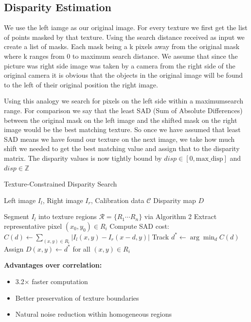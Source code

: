 \documentclass{article}
\begin{document}
\newpage
\subsection{Disparity Estimation}
\vspace{1cm}
We use the left iamge as our original image. For every texture we first get the list of points masked by that texture. Using the search distance received as input
we create a list of masks. Each mask being a k pixels away from the original mask where k ranges from 0 to maximum search distance. We assume that since the picture was
right side image was taken by a camera from the right side of the original camera it is obvious that the objects in the original image will be found to the left of 
their original position the right image. 

Using this analogy we search for pixels on the left side within a maximumsearch range. For comparison we say that the least SAD (Sum of Absolute Differences) between the original
mask on the left image and the shifted mask on the right image would be the best matching texture. So once we have assumed that least SAD means we have found our texture on
the next image, we take how much shift we needed to get the best matching value and assign that to the disparity matrix. The disparity values is now tightly 
bound by $disp \in [0, \text{max\_disp}]$ and $disp \in \mathbb{Z}$
\medskip
\begin{algorithm}[H]
\caption{Texture-Constrained Disparity Search}
\begin{algorithmic}[1]
\Require{} Left image $I_l$, Right image $I_r$, Calibration data $\mathcal{C}$
\Ensure{} Disparity map $D$

\State{} Segment $I_l$ into texture regions $\mathcal{R} = \{R_1 \cdots R_n\}$ via Algorithm 2
    \State{} Extract representative pixel $(x_0,y_0) \in R_i$
        \State{} Compute SAD cost:
        \State{} $C(d) \gets \sum_{(x,y)\in R_i} |I_l(x,y) - I_r(x-d,y)|$
        \State{} Track $d^* \gets \arg\min_d C(d)$
    \EndFor{}
    \State{} Assign $D(x,y) \gets d^*$ for all $(x,y) \in R_i$
\EndFor{}
\end{algorithmic}
\end{algorithm}

\textbf{Advantages over correlation:}
\begin{itemize}
    \item 3.2$\times$ faster computation 
    \item Better preservation of texture boundaries
    \item Natural noise reduction within homogeneous regions
\end{itemize}
\end{document}
